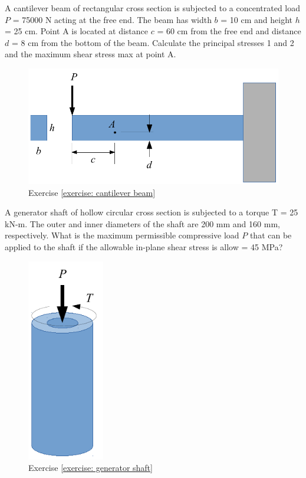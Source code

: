 \documentclass[
10pt,
a4paper,
openany,
svgnames,
]{kaobook} %
\begin{document}
\begin{exercises}

  \item \label{exercise: cantilever beam} A cantilever beam of rectangular cross section is subjected to a concentrated load $P$ = 75000 N acting at the free end. The beam has width $b$ = 10 cm and height $h$ = 25 cm. Point A is located at distance $c$ = 60 cm from the free end and distance $d$ = 8 cm from the bottom of the beam. Calculate the principal stresses 1 and 2 and the maximum shear stress max at point A.
  \begin{figure}[h]
    \centering
    \includegraphics[scale=0.7]{pictures/Static-body-load-analysis/multiaxial-cantilever-beam-exercise}
    \caption{Exercise \ref{exercise: cantilever beam}}
  \end{figure}
  
  \item \label{exercise: generator shaft}A generator shaft of hollow circular cross section is subjected to a torque T = 25 kN-m. The outer and inner diameters of the shaft are 200 mm and 160 mm, respectively. What is the maximum permissible compressive load $P$ that can be applied to the shaft if the allowable in-plane shear stress is allow = 45 MPa?
  
  \begin{figure}[h]
    \centering
    \includegraphics[width=0.3\textwidth]{pictures/Static-body-load-analysis/multiaxial-generator-shaft-exercise}
    \caption{Exercise \ref{exercise: generator shaft}}
  \end{figure}
  

\end{exercises}
\end{document}

